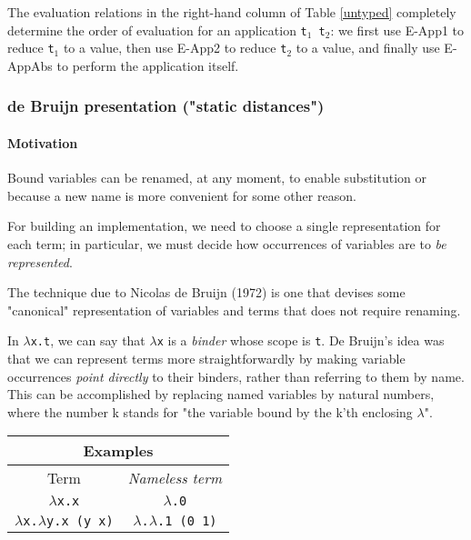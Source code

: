 \documentclass{article}
\begin{document}
The evaluation relations in the right-hand column of Table \ref{untyped} completely determine the order of evaluation for an application \texttt{t$_1$ t$_2$}: we first use E-App1 to reduce \texttt{t$_1$} to a value, then use E-App2 to reduce \texttt{t$_2$} to a value, and finally use E-AppAbs to perform the application itself.

\subsubsection{de Bruijn presentation ("static distances")}

\paragraph{Motivation} Bound variables can be renamed, at any moment, to enable substitution or because a new name is more convenient for some other reason.

For building an implementation, we need to choose a single representation for each term; in particular, we must decide how occurrences of variables are to \emph{be represented}.

The technique due to Nicolas de Bruijn (1972) is one that devises some "canonical" representation of variables and terms that does not require renaming.

In \texttt{$\lambda$x.t}, we can say that \texttt{$\lambda$x} is a \emph{binder} whose scope is \texttt{t}. De Bruijn's idea was that we can represent terms more straightforwardly by making variable occurrences \emph{point directly} to their binders, rather than referring to them by name. This can be accomplished by replacing named variables by natural numbers, where the number k stands for "the variable bound by the k'th enclosing $\lambda$".

\begin{table}[h!]
    \centering
    \begin{tabular}{|c|c|}
    \hline
    \multicolumn{2}{|c|}{\textbf{Examples}} \\
    \hline
    Term & \emph{Nameless term} \\
    \hline
    \texttt{$\lambda$x.x} & \texttt{$\lambda$.0}  \\
    \texttt{$\lambda$x.$\lambda$y.x (y x)} & \texttt{$\lambda$.$\lambda$.1 (0 1)}  \\
    \hline
    \end{tabular}
\end{table}
\end{document}
